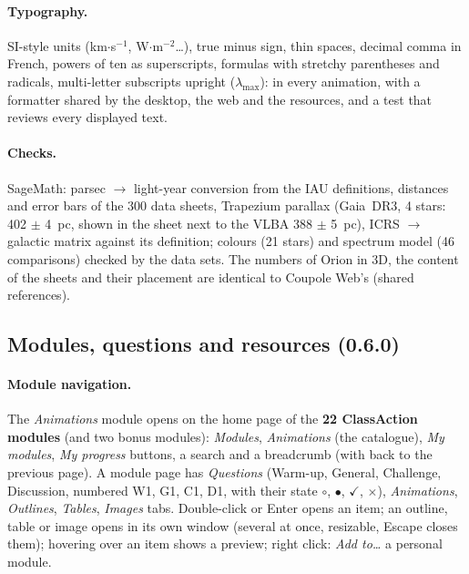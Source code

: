 \paragraph{Typography.} SI-style units (km$\cdot$s$^{-1}$, W$\cdot$m$^{-2}$…), true minus sign, thin spaces,
decimal comma in French, powers of ten as superscripts, formulas with stretchy parentheses and radicals, multi-letter
subscripts upright ($\lambda_{\mathrm{max}}$): in every animation, with a formatter shared by the desktop, the web and
the resources, and a test that reviews every displayed text.

\paragraph{Checks.} SageMath: parsec $\to$ light-year conversion from the IAU definitions, distances and error bars of
the 300 data sheets, Trapezium parallax (Gaia~DR3, 4 stars: 402 $\pm$ 4~pc, shown in the sheet next to the VLBA
388 $\pm$ 5~pc), ICRS $\to$ galactic matrix against its definition; colours (21 stars) and spectrum model (46
comparisons) checked by the data sets. The numbers of Orion in 3D, the content of the sheets and their placement are
identical to Coupole Web's (shared references).

\subsection{Modules, questions and resources (0.6.0)}\label{sec:classe}
\paragraph{Module navigation.} The \emph{Animations} module opens on the home page of the \textbf{22 ClassAction
modules} (and two bonus modules): \emph{Modules}, \emph{Animations} (the catalogue), \emph{My modules}, \emph{My
progress} buttons, a search and a breadcrumb (with back to the previous page). A module page has \emph{Questions}
(Warm-up, General, Challenge, Discussion, numbered W1, G1, C1, D1, with their state $\circ$, $\bullet$, $\checkmark$, $\times$), \emph{Animations},
\emph{Outlines}, \emph{Tables}, \emph{Images} tabs. Double-click or Enter opens an item; an outline, table or image
opens in its own window (several at once, resizable, Escape closes them); hovering over an item shows a preview; right
click: \emph{Add to\dots{}} a personal module.

